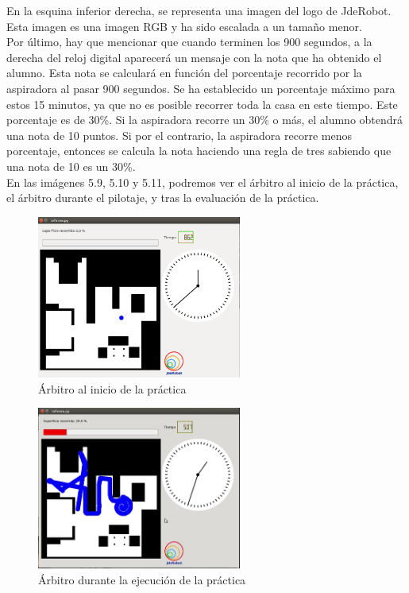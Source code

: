 En la esquina inferior derecha, se representa una imagen del logo de JdeRobot. Esta imagen es una imagen RGB y ha sido escalada a un tamaño menor.\\

Por último, hay que mencionar que cuando terminen los 900 segundos, a la derecha del reloj digital aparecerá un mensaje con la nota que ha obtenido el alumno. Esta nota se calculará en función del porcentaje recorrido por la aspiradora al pasar 900 segundos. Se ha establecido un porcentaje máximo para estos 15 minutos, ya que no es posible recorrer toda la casa en este tiempo. Este porcentaje es de 30\%. Si la aspiradora recorre un 30\% o más, el alumno obtendrá una nota de 10 puntos. Si por el contrario, la aspiradora recorre menos porcentaje, entonces se calcula la nota haciendo una regla de tres sabiendo que una nota de 10 es un 30\%.\\

En las imágenes 5.9, 5.10 y 5.11, podremos ver el árbitro al inicio de la práctica, el árbitro durante el pilotaje, y tras la evaluación de la práctica.\\

\begin{figure}[H]
  \begin{center}
    \includegraphics[width=0.6\textwidth]{figures/Vacuum/Referee_Vacuum.png}
		\caption{Árbitro al inicio de la práctica}
		\label{fig.Referee_Vacuum}
		\end{center}
\end{figure}

\begin{figure}[H]
  \begin{center}
    \includegraphics[width=0.6\textwidth]{figures/Vacuum/Referee_Vacuum2.png}
		\caption{Árbitro durante la ejecución de la práctica}
		\label{fig.Referee_Vacuum2}
		\end{center}
\end{figure}

